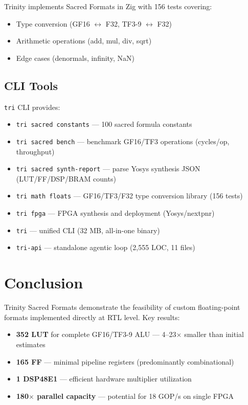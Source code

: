 \documentclass[10pt,conference]{IEEEtran}
\begin{document}
Trinity implements Sacred Formats in Zig with 156 tests covering:
\begin{itemize}
  \item Type conversion (GF16 $\leftrightarrow$ F32, TF3-9 $\leftrightarrow$ F32)
  \item Arithmetic operations (add, mul, div, sqrt)
  \item Edge cases (denormals, infinity, NaN)
\end{itemize}

\subsection{CLI Tools}

\texttt{tri} CLI provides:
\begin{itemize}
  \item \texttt{tri sacred constants} — 100 sacred formula constants
  \item \texttt{tri sacred bench} — benchmark GF16/TF3 operations (cycles/op, throughput)
  \item \texttt{tri sacred synth-report} — parse Yosys synthesis JSON (LUT/FF/DSP/BRAM counts)
  \item \texttt{tri math floats} — GF16/TF3/F32 type conversion library (156 tests)
  \item \texttt{tri fpga} — FPGA synthesis and deployment (Yosys/nextpnr)
  \item \texttt{tri} — unified CLI (32 MB, all-in-one binary)
  \item \texttt{tri-api} — standalone agentic loop (2,555 LOC, 11 files)
\end{itemize}


\section{Conclusion}

Trinity Sacred Formats demonstrate the feasibility of custom floating-point formats implemented directly at RTL level. Key results:
\begin{itemize}
  \item \textbf{352 LUT} for complete GF16/TF3-9 ALU — 4--23$\times$ smaller than initial estimates
  \item \textbf{165 FF} — minimal pipeline registers (predominantly combinational)
  \item \textbf{1 DSP48E1} — efficient hardware multiplier utilization
  \item \textbf{180$\times$ parallel capacity} — potential for 18 GOP/s on single FPGA
\end{itemize}
\end{document}
